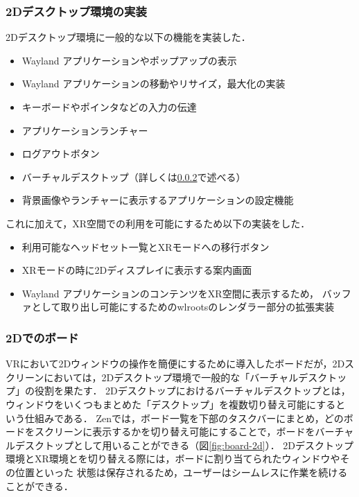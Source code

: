 \subsubsection{2Dデスクトップ環境の実装}

2Dデスクトップ環境に一般的な以下の機能を実装した．

\begin{itemize}
  \item Wayland アプリケーションやポップアップの表示
  \item Wayland アプリケーションの移動やリサイズ，最大化の実装
  \item キーボードやポインタなどの入力の伝達
  \item アプリケーションランチャー
  \item ログアウトボタン
  \item バーチャルデスクトップ（詳しくは\ref{subsubsection:2d-board}で述べる）
  \item 背景画像やランチャーに表示するアプリケーションの設定機能
\end{itemize}

これに加えて，XR空間での利用を可能にするため以下の実装をした．

\begin{itemize}
  \item 利用可能なヘッドセット一覧とXRモードへの移行ボタン
  \item XRモードの時に2Dディスプレイに表示する案内画面
  \item Wayland アプリケーションのコンテンツをXR空間に表示するため，
        バッファとして取り出し可能にするためのwlrootsのレンダラー部分の拡張実装
\end{itemize}

\subsubsection{2Dでのボード}
\label{subsubsection:2d-board}

VRにおいて2Dウィンドウの操作を簡便にするために導入したボードだが，2Dスクリーンにおいては，2Dデスクトップ環境で一般的な「バーチャルデスクトップ」の役割を果たす．
2Dデスクトップにおけるバーチャルデスクトップとは，ウィンドウをいくつもまとめた「デスクトップ」を複数切り替え可能にするという仕組みである．
Zenでは，ボード一覧を下部のタスクバーにまとめ，どのボードをスクリーンに表示するかを切り替え可能にすることで，ボードをバーチャルデスクトップとして用いることができる（図\ref{fig:board-2d}）．
2Dデスクトップ環境とXR環境とを切り替える際には，ボードに割り当てられたウィンドウやその位置といった
状態は保存されるため，ユーザーはシームレスに作業を続けることができる．

